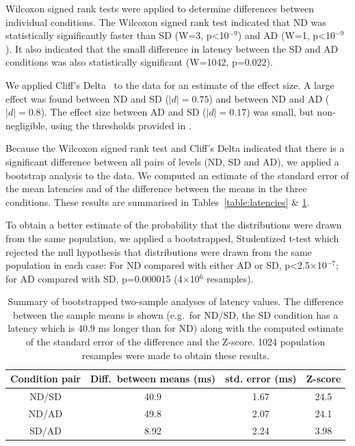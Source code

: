 \documentclass[10pt,letterpaper]{article}
\begin{document}

Wilcoxon signed rank tests were applied to determine differences
between individual conditions. The Wilcoxon signed rank test indicated
that ND was statistically significantly faster than SD (W=3,
p\textless10$^{-9}$) and AD (W=1, p\textless10$^{-9}$). It also indicated
that the small difference in latency between the SD and AD conditions
was also statistically significant (W=1042, p=0.022).

We applied Cliff's Delta~\cite{cliff_ordinal_2014} to the data for
an estimate of the effect size. A large effect was found between ND
and SD ($|d|=0.75$) and between ND and AD ($|d|=0.8$). The effect size
between AD and SD ($|d|=0.17$) was small, but non-negligible, using
the thresholds provided in \cite{romano_appropriate_2006}.

Because the Wilcoxon signed rank test and Cliff's Delta indicated that
there is a significant difference between all pairs of levels (ND, SD
and AD), we applied a bootstrap analysis to the data. We computed an
estimate of the standard error of the mean latencies and of the
difference between the means in the three conditions. These results
are summarised in Tables~\ref{table:latencies} \&
\ref{table:twosample}.

To obtain a better estimate of the probability that the distributions
were drawn from the same population, we applied a bootstrapped,
Studentized t-test which rejected the null hypothesis that
distributions were drawn from the same population in each case: For ND
compared with either AD or SD, p\textless2.5$\times$10$^{-7}$; for AD
compared with SD, p=0.000015 (4$\times$10$^{6}$ resamples).

\begin{table}[ht]
\caption{Summary of bootstrapped two-sample analyses of latency
  values. The difference between the sample means is shown (e.g.~for
  ND/SD, the SD condition has a latency which is 40.9 ms longer than
  for ND) along with the computed estimate of the standard error of
  the difference and the Z-score. 1024 population resamples were made
  to obtain these results.}  \centering
\begin{tabular}{c c c c}
\hline
\textbf{Condition pair} & \textbf{Diff.~between means (ms)} & \textbf{std. error (ms)} & \textbf{Z-score}  \\ [0.5ex]
\hline
ND/SD & 40.9 & 1.67 & 24.5 \\
ND/AD & 49.8 & 2.07 & 24.1 \\
SD/AD & 8.92 & 2.24 & 3.98 \\ [1ex]
\hline
\end{tabular}
\label{table:twosample}
\end{table}
\end{document}
